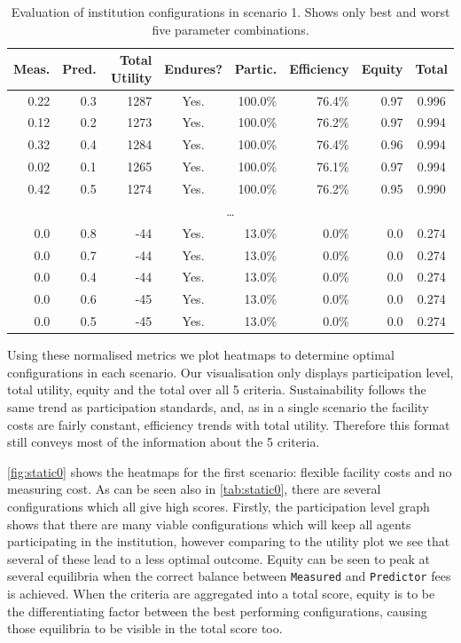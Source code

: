 \begin{table}
\centering
\caption{Evaluation of institution configurations in scenario 1. Shows only best and worst five parameter combinations.}\label{tab:static0}
\begin{tabular}{r|r||r|c|r|r|r||c}
Meas. & Pred. & Total Utility & Endures? & Partic. & Efficiency & Equity & Total \\
\hline
0.22 & 0.3 & 1287 & Yes. & 100.0\% & 76.4\% & 0.97 & 0.996 \\
0.12 & 0.2 & 1273 & Yes. & 100.0\% & 76.2\% & 0.97 & 0.994 \\
0.32 & 0.4 & 1284 & Yes. & 100.0\% & 76.4\% & 0.96 & 0.994 \\
0.02 & 0.1 & 1265 & Yes. & 100.0\% & 76.1\% & 0.97 & 0.994 \\
0.42 & 0.5 & 1274 & Yes. & 100.0\% & 76.2\% & 0.95 & 0.990 \\
\multicolumn{8}{c}{\ldots} \\
0.0 & 0.8 & -44 & Yes. & 13.0\% & 0.0\% & 0.0 & 0.274 \\
0.0 & 0.7 & -44 & Yes. & 13.0\% & 0.0\% & 0.0 & 0.274 \\
0.0 & 0.4 & -44 & Yes. & 13.0\% & 0.0\% & 0.0 & 0.274 \\
0.0 & 0.6 & -45 & Yes. & 13.0\% & 0.0\% & 0.0 & 0.274 \\
0.0 & 0.5 & -45 & Yes. & 13.0\% & 0.0\% & 0.0 & 0.274 \\
\end{tabular}
\end{table}

Using these normalised metrics we plot heatmaps to determine optimal
configurations in each scenario. Our visualisation only displays participation
level, total utility, equity and the total over all 5 criteria.
Sustainability follows the same trend as participation standards, and, as in a
single scenario the facility costs are fairly constant, efficiency trends with
total utility. Therefore this format still conveys most of the information about the
5 criteria.

\autoref{fig:static0} shows the heatmaps for the first scenario: flexible
facility costs and no measuring cost. As can be seen also in
\autoref{tab:static0}, there are several configurations which all give high
scores. Firstly, the participation level graph shows that there are many
viable configurations which will keep all agents participating in the
institution, however comparing to the utility plot we see that several of
these lead to a less optimal outcome. Equity can be seen to peak at several
equilibria when the correct balance between \texttt{Measured} and
\texttt{Predictor} fees is achieved. When the criteria are aggregated into a
total score, equity is to be the differentiating factor between the best
performing configurations, causing those equilibria to be visible in the total
score too.

